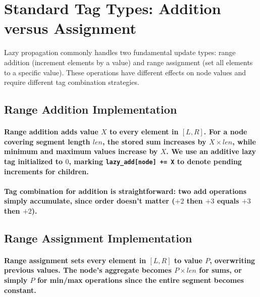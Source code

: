 \section{Standard Tag Types: Addition versus Assignment}
\label{sec:standard_tags}
Lazy propagation commonly handles two fundamental update types: range addition (increment elements by a value) and range assignment (set all elements to a specific value). These operations have different effects on node values and require different tag combination strategies.
\subsection{Range Addition Implementation}
\paragraph{Range addition adds value $X$ to every element in $[L,R]$. For a node covering segment length $len$, the stored sum increases by $X \times len$, while minimum and maximum values increase by $X$. We use an additive lazy tag initialized to $0$, marking \texttt{lazy\_add[node] += X} to denote pending increments for children.}
\paragraph{Tag combination for addition is straightforward: two add operations simply accumulate, since order doesn't matter ($+2$ then $+3$ equals $+3$ then $+2$).}
\subsection{Range Assignment Implementation}
\paragraph{Range assignment sets every element in $[L,R]$ to value $P$, overwriting previous values. The node's aggregate becomes $P \times len$ for sums, or simply $P$ for min/max operations since the entire segment becomes constant.}
